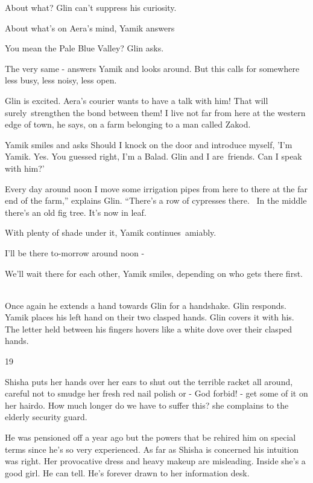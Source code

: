 \documentclass[letterpaper]{article}
\begin{document}
{\textquotedbl}About what?{\textquotedbl} Glin can't suppress his curiosity.

{\textquotedbl}About what's on Aera's mind,{\textquotedbl} Yamik answers 

{\textquotedbl}You mean the Pale Blue Valley?{\textquotedbl} Glin asks. 

{\textquotedbl}The very same -{\textquotedbl} answers Yamik and looks around. {\textquotedbl}But this calls for
somewhere less busy, less noisy, less open.{\textquotedbl} 

Glin is excited.  Aera's courier wants to have a talk with him! That will surely\ strengthen the bond between them!
{\textquotedbl}I live not far from here at the western edge of town,{\textquotedbl} he says, {\textquotedbl}on a farm
belonging to a man called Zakod.{\textquotedbl} 

Yamik smiles and asks {\textquotedbl}Should I knock on the door and introduce myself, 'I'm Yamik. Yes. You guessed
right, I'm a Balad. Glin and I are~friends. Can I speak with him?{}'{\textquotedbl} 

{\textquotedbl}Every day around noon I move some irrigation pipes from here to there at the far end of the farm,''
explains Glin. ``There's a row of cypresses there. ~In the middle there's an old fig tree. It's now in
leaf.{\textquotedbl} 

{\textquotedbl}With plenty of shade under it,{\textquotedbl} Yamik continues~amiably. 

{\textquotedbl}I'll be there to-morrow around noon -{\textquotedbl}

{\textquotedbl}We'll wait there for each other,{\textquotedbl} Yamik smiles, {\textquotedbl}depending on who gets there
first.{\textquotedbl} ~

Once again he extends a hand towards Glin for a handshake. Glin responds. Yamik places his left hand on their two
clasped hands. Glin covers it with his. The letter held between his fingers hovers like a white dove over their clasped
hands.


\bigskip

19\ 

Shisha puts her hands over her ears to shut out the terrible racket all around, careful not to smudge her fresh red nail
polish or - God forbid! - get some of it on her hairdo. {\textquotedbl}How much longer do we have to suffer
this?{\textquotedbl} she complains to the elderly security guard.

He was pensioned off a year ago but the powers that be rehired him on special terms since he's so very experienced. As
far as Shisha is concerned his intuition was right. Her provocative dress and heavy makeup are misleading. Inside she's
a good girl. He can tell. He{}'s forever drawn to her information desk.
\end{document}
